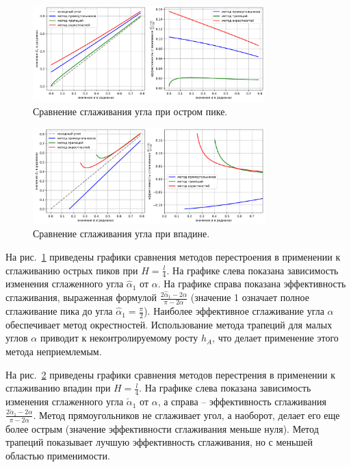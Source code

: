 \documentclass[a4paper,14pt]{extarticle}                     %
\theoremstyle{plain}                                         %
\begin{document}
\begin{figure}[ht]
\centering
\includegraphics[width=0.8\textwidth]{./pics/text_1_remesh_2d/peak-methods-chart.png}
\singlespacing
\caption{Сравнение сглаживания угла при остром пике.}
\label{fig:text_1_remesh_2d_peak_methods_chart}
\end{figure}

\begin{figure}[!ht]
\centering
\includegraphics[width=0.8\textwidth]{./pics/text_1_remesh_2d/cavern-methods-chart.png}
\singlespacing
\caption{Сравнение сглаживания угла при впадине.}
\label{fig:text_1_remesh_2d_cavern_methods_chart}
\end{figure}

На рис.~\ref{fig:text_1_remesh_2d_peak_methods_chart} приведены графики сравнения методов перестроения в применении к сглаживанию острых пиков при $H = \frac{l}{4}$.
На графике слева показана зависимость изменения сглаженного угла $\hat{\alpha}_1$ от $\alpha$.
На графике справа показана эффективность сглаживания, выраженная формулой $\frac{2 \hat{\alpha}_1 - 2 \alpha}{\pi - 2 \alpha}$ (значение 1 означает полное сглаживание пика до угла $\hat{\alpha}_1 = \frac{\pi}{2}$).
Наиболее эффективное сглаживание угла $\alpha$ обеспечивает метод окрестностей.
Использование метода трапеций для малых углов $\alpha$ приводит к неконтролируемому росту $h_A$, что делает применение этого метода неприемлемым.

На рис.~\ref{fig:text_1_remesh_2d_cavern_methods_chart} приведены графики сравнения методов перестрения в применении к сглаживанию впадин при $H = \frac{l}{4}$.
На графике слева показана зависимость изменения сглаженного угла $\check{\alpha}_1$ от $\alpha$, а справа -- эффективность сглаживания $\frac{2 \check{\alpha}_1 - 2 \alpha}{\pi - 2 \alpha}$.
Метод прямоугольников не сглаживает угол, а наоборот, делает его еще более острым (значение эффективности сглаживания меньше нуля).
Метод трапеций показывает лучшую эффективность сглаживания, но с меньшей областью применимости.
\end{document}
